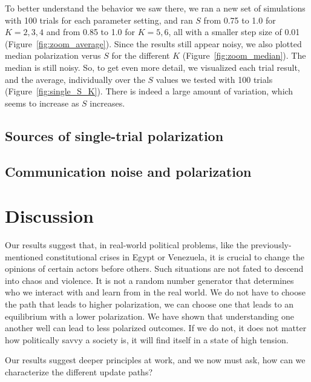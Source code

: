 \documentclass[11pt,letterpaper]{article}
\begin{document}
To better understand the behavior we saw there, we ran a new set of simulations
with 100 trials for each parameter setting, and ran $S$ from 0.75 to 1.0 for
$K=2, 3, 4$ and from 0.85 to 1.0 for $K=5,6$, all with a smaller step size 
of 0.01 (Figure~\ref{fig:zoom_average}). Since the results still appear
noisy, we also plotted median polarization verus $S$ for the different $K$
(Figure~\ref{fig:zoom_median}). The median is still noisy. So, to get even
more detail, we visualized each trial result, and the average, individually
over the $S$ values we tested with 100 trials (Figure~\ref{fig:single_S_K}).
There is indeed a large amount of variation, which seems to increase as $S$
increases.




\subsection{Sources of single-trial polarization}


\subsection{Communication noise and polarization}



\section{Discussion}

Our results suggest that, in real-world political problems, 
like the previously-mentioned constitutional crises in Egypt or Venezuela,
it is crucial to change the opinions of certain actors before others. Such 
situations are not fated to descend into chaos and violence. It is not a
random number generator that determines who we interact with and learn from 
in the real world. We do not have to choose the path that leads to higher 
polarization, we can choose one that leads to an equilibrium with a lower
polarization.  We have shown that understanding one another well can lead to 
less polarized outcomes. If we do not, it does not matter how politically savvy
a society is, it will find itself in a state of high tension.

Our results suggest deeper principles at work, and we now must ask, how can
we characterize the different update paths?

\clearpage



\clearpage



\setlength{\bibleftmargin}{.125in}
\setlength{\bibindent}{-\bibleftmargin}


\end{document}

